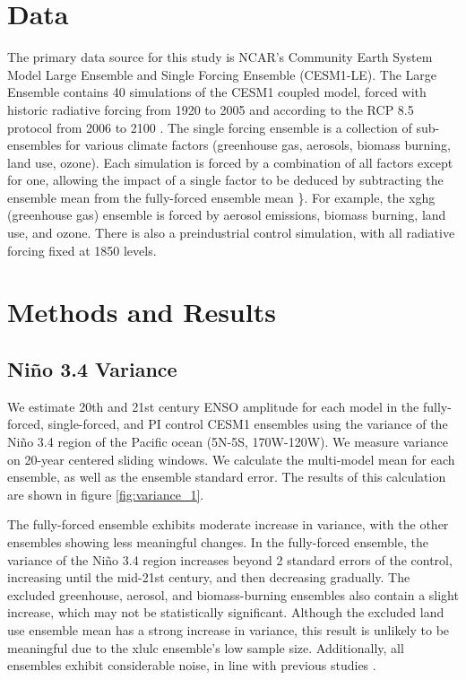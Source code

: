 \documentclass[11pt]{article}
\begin{document}
\section{Data}
\label{sec:org91f7f64}
The primary data source for this study is NCAR's Community Earth System Model Large Ensemble and Single Forcing Ensemble (CESM1-LE). The Large Ensemble contains 40 simulations of the CESM1 coupled model, forced with historic radiative forcing from 1920 to 2005 and according to the RCP 8.5 protocol from 2006 to 2100 \citep{kay2015community}. The single forcing ensemble is a collection of sub-ensembles for various climate factors (greenhouse gas, aerosols, biomass burning, land use, ozone). Each simulation is forced by a combination of all factors except for one, allowing the impact of a single factor to be deduced by subtracting the ensemble mean from the fully-forced ensemble mean \citep{deser2020isolating}\}. For example, the xghg (greenhouse gas) ensemble is forced by aerosol emissions, biomass burning, land use, and ozone. There is also a preindustrial control simulation, with all radiative forcing fixed at 1850 levels.

\section{Methods and Results}
\label{sec:orgd9fdb5e}

\subsection{Niño 3.4 Variance}
\label{sec:orge2424fe}
We estimate 20th and 21st century ENSO amplitude for each model in the fully-forced, single-forced, and PI control CESM1 ensembles using the variance of the Niño 3.4 region of the Pacific ocean (5N-5S, 170W-120W). We measure variance on 20-year centered sliding windows. We calculate the multi-model mean for each ensemble, as well as the ensemble standard error. The results of this calculation are shown in figure \ref{fig:variance_1}.

The fully-forced ensemble exhibits moderate increase in variance, with the other ensembles showing less meaningful changes. In the fully-forced ensemble, the variance of the Niño 3.4 region increases beyond 2 standard errors of the control, increasing until the mid-21st century, and then decreasing gradually. The excluded greenhouse, aerosol, and biomass-burning ensembles also contain a slight increase, which may not be statistically significant. Although the excluded land use ensemble mean has a strong increase in variance, this result is unlikely to be meaningful due to the xlulc ensemble's low sample size. Additionally, all ensembles exhibit considerable noise, in line with previous studies \citep{maher2018enso}.
\end{document}
